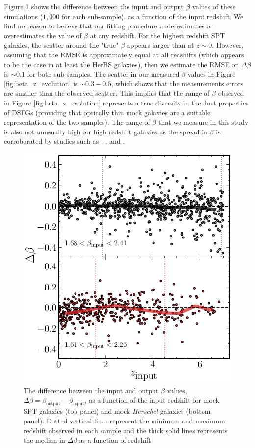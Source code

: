 Figure \ref{fig:beta_z_simulation} shows the difference between the input and output $\beta$ values of these simulations ($1,000$ for each sub-sample), as a function of the input redshift. We find no reason to believe that our fitting procedure underestimates or overestimates the value of $\beta$ at any redshift. For the highest redshift SPT galaxies, the scatter around the "true" $\beta$ appears larger than at $z \sim 0$. However, assuming that the RMSE is approximately equal at all redshifts (which appears to be the case in at least the HerBS galaxies), then we estimate the RMSE on $\Delta \beta$ is $\sim 0.1$ for both sub-samples. The scatter in our measured $\beta$ values in Figure \ref{fig:beta_z_evolution} is $\sim 0.3 - 0.5$, which shows that the measurements errors are smaller than the observed scatter. This implies that the range of $\beta$ observed in Figure \ref{fig:beta_z_evolution} represents a true diversity in the dust properties of DSFGs (providing that optically thin mock galaxies are a suitable representation of the two samples). The range of $\beta$ that we measure in this study is also not unusually high for high redshift galaxies as the spread in $\beta$ is corroborated by studies such as \citealt{daCunha_2021}, \citealt{Cooper_2022}, \citealt{Ismail_2023} and \citealt{Witstok_2023}.

\begin{figure}
	\centering
	\includegraphics[width=0.8\columnwidth]{figures/beta_simulations.pdf}
	\caption[Difference between input and output $\beta$ from simulations of mock galaxies]{The difference between the input and output $\beta$ values, $\Delta \beta = \beta_{\textrm{output}} - \beta_{\textrm{input}}$, as a function of the input redshift for mock SPT galaxies (top panel) and mock \textit{Herschel} galaxies (bottom panel). Dotted vertical lines represent the minimum and maximum redshift observed in each sample and the thick solid lines represents the median in $\Delta \beta$ as a function of redshift}
	\label{fig:beta_z_simulation}
\end{figure}

